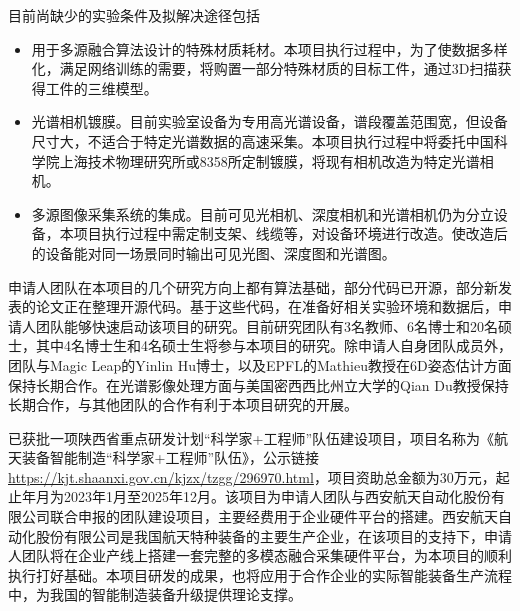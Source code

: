 \documentclass[12pt]{article}
\begin{document}
目前尚缺少的实验条件及拟解决途径包括
\begin{itemize}
    \item 用于多源融合算法设计的特殊材质耗材。本项目执行过程中，为了使数据多样化，满足网络训练的需要，将购置一部分特殊材质的目标工件，通过3D扫描获得工件的三维模型。
    \item 光谱相机镀膜。目前实验室设备为专用高光谱设备，谱段覆盖范围宽，但设备尺寸大，不适合于特定光谱数据的高速采集。本项目执行过程中将委托中国科学院上海技术物理研究所或8358所定制镀膜，将现有相机改造为特定光谱相机。
    \item 多源图像采集系统的集成。目前可见光相机、深度相机和光谱相机仍为分立设备，本项目执行过程中需定制支架、线缆等，对设备环境进行改造。使改造后的设备能对同一场景同时输出可见光图、深度图和光谱图。
\end{itemize}

申请人团队在本项目的几个研究方向上都有算法基础，部分代码已开源，部分新发表的论文正在整理开源代码。基于这些代码，在准备好相关实验环境和数据后，申请人团队能够快速启动该项目的研究。目前研究团队有3名教师、6名博士和20名硕士，其中4名博士生和4名硕士生将参与本项目的研究。除申请人自身团队成员外，团队与Magic Leap的Yinlin Hu博士，以及EPFL的Mathieu教授在6D姿态估计方面保持长期合作。在光谱影像处理方面与美国密西西比州立大学的Qian Du教授保持长期合作，与其他团队的合作有利于本项目研究的开展。


已获批一项陕西省重点研发计划“科学家+工程师”队伍建设项目，项目名称为《航天装备智能制造“科学家+工程师”队伍》，公示链接\url{https://kjt.shaanxi.gov.cn/kjzx/tzgg/296970.html}，项目资助总金额为30万元，起止年月为2023年1月至2025年12月。该项目为申请人团队与西安航天自动化股份有限公司联合申报的团队建设项目，主要经费用于企业硬件平台的搭建。西安航天自动化股份有限公司是我国航天特种装备的主要生产企业，在该项目的支持下，申请人团队将在企业产线上搭建一套完整的多模态融合采集硬件平台，为本项目的顺利执行打好基础。本项目研发的成果，也将应用于合作企业的实际智能装备生产流程中，为我国的智能制造装备升级提供理论支撑。


\end{document}
